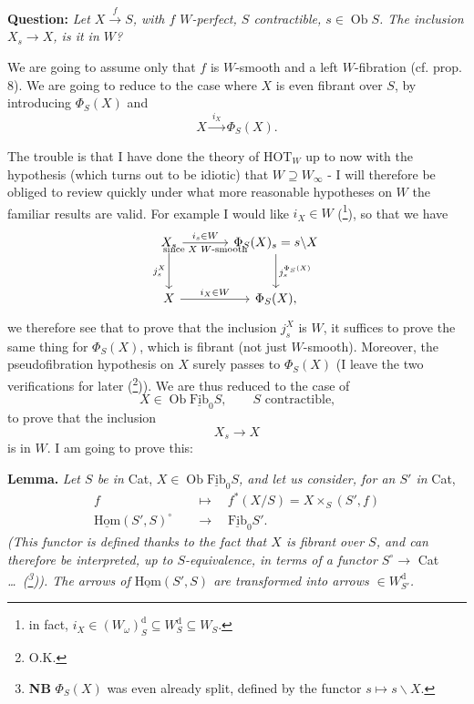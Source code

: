 \documentclass[11pt,leqno]{article}
\newcommand{\printedpage}[1]{\marginpar{\footnotesize p.~#1}}
\newcommand{\msp}[1]{\marginpar{\footnotesize [#1]}}
\newcommand{\fl}{\longrightarrow}
\newcommand{\uHom}{\underline{\mathrm{Hom}}}
\newcommand{\uFib}{\underline{\mathrm{Fib}}}
\newcommand{\Ob}{\operatorname{Ob}}
\newcommand{\HOT}{\mathrm{HOT}}
\begin{document}
\textbf{Question:} \textit{Let $X\xrightarrow{\ f\ }S$, with $f$ $W$-perfect, $S$ contractible, $s\in\Ob S$. The inclusion $X_s\fl X$, is it in $W$?}

\printedpage{32}
\msp{page 43}We are going to assume only that $f$ is $W$-smooth and a left $W$-fibration (cf. prop. 8). We are going to reduce to the case where $X$ is even fibrant over $S$, by introducing $\Phi_S(X)$ and %
\[ X\xrightarrow{\ i_X\ }\Phi_S(X). \]

The trouble is that I have done the theory of $\HOT_W$ up to now with the hypothesis (which turns out to be idiotic) that $W\supseteq W_\infty$ - I will therefore be obliged to review quickly under what more reasonable hypotheses on $W$ the familiar results are valid. For example I would like $i_X\in W$ (\footnote[50]{in fact, $i_X\in(W_\omega)^{\mathrm{d}}_S\subseteq W^{\mathrm{d}}_S\subseteq W_S$.}), so that we have
\[
\begin{tikzcd}[column sep=large, row sep=large]
X_s \arrow[r, "i_s\in W", "\text{since $X$ $W$-smooth}"'] \arrow[d, "j^X_s"'] & \Phi_S(X)_s=s\backslash X \arrow[d, "j_s^{\Phi_S(X)}"] \\
X \arrow[r, "i_X\in W"] & \Phi_S(X),
\end{tikzcd}
\]
we therefore see that to prove that the inclusion $j^X_s$ is $W$, it suffices to prove the same thing for $\Phi_S(X)$, which is fibrant (not just $W$-smooth). Moreover, the pseudofibration hypothesis on $X$ surely passes to $\Phi_S(X)$ (I leave the two verifications for later (\footnote[51]{O.K.})). We are thus reduced to the case of
\[ X\in\Ob\uFib_0S, \qquad S\text{ contractible,} \]
to prove that the inclusion
\[ X_s\fl X \]
\msp{page 44}is in $W$. I am going to prove this:

\textbf{Lemma.} \textit{Let $S$ be in} Cat, \textit{$X\in\Ob\uFib_0S$, and let us consider, for an $S'$ in} Cat,
\[
\begin{aligned}
f &\quad\longmapsto\quad f^*(X/S)=X\times_S(S',f)\\
\uHom(S',S)^{\circ} &\quad\longrightarrow\quad \uFib_0S'.
\end{aligned}
\]
\textit{(This functor is defined thanks to the fact that $X$ is fibrant over $S$, and can therefore be interpreted, up to $S$-equivalence, in terms of a functor $S^{\circ}\fl$} Cat \textit{\dots\ (\footnote[52]{\textbf{NB} $\Phi_S(X)$ was even already split, defined by the functor $s\longmapsto s\backslash X$.})). The arrows of $\uHom(S',S)$ are transformed into arrows $\in W^{\mathrm{d}}_{S'}$.}
\end{document}
